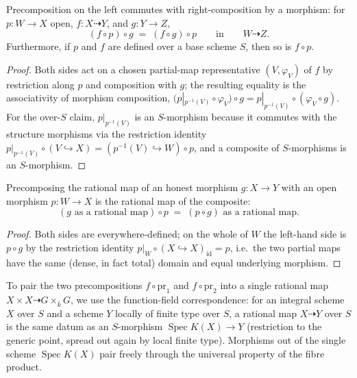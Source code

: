\begin{lemma}\leanok
  \label{lem:rationalMap_precomp_compHom}
  Precomposition on the left commutes with right-composition by a morphism: for
  \(p \colon W \to X\) open, \(f \colon X \dashrightarrow Y\), and \(g \colon Y \to Z\),
  \[
    (f \circ p) \circ g \;=\; (f \circ g) \circ p
    \qquad\text{in}\qquad W \dashrightarrow Z .
  \]
  Furthermore, if \(p\) and \(f\) are defined over a base scheme \(S\), then so is
  \(f \circ p\).
\end{lemma}
\begin{proof}\leanok
  Both sides act on a chosen partial-map representative \((V, \varphi_V)\) of \(f\) by
  restriction along \(p\) and composition with \(g\); the resulting equality is the
  associativity of morphism composition,
  \((p|_{p^{-1}(V)} \circ \varphi_V) \circ g = p|_{p^{-1}(V)} \circ (\varphi_V \circ g)\).
  For the over-\(S\) claim, \(p|_{p^{-1}(V)}\) is an \(S\)-morphism because it commutes with
  the structure morphisms via the restriction identity
  \(p|_{p^{-1}(V)} \circ (V \hookrightarrow X) = (p^{-1}(V) \hookrightarrow W) \circ p\),
  and a composite of \(S\)-morphisms is an \(S\)-morphism.
\end{proof}

\begin{lemma}\leanok
  \label{lem:rationalMap_precomp_hom}
  Precomposing the rational map of an honest morphism \(g \colon X \to Y\) with an open
  morphism \(p \colon W \to X\) is the rational map of the composite:
  \[
    (g \text{ as a rational map}) \circ p \;=\; (p \circ g) \text{ as a rational map} .
  \]
\end{lemma}
\begin{proof}\leanok
  Both sides are everywhere-defined; on the whole of \(W\) the left-hand side is
  \(p \circ g\) by the restriction identity \(p|_{W} \circ (X \hookrightarrow X)_{\mathrm{id}}
  = p\), i.e.\ the two partial maps have the same (dense, in fact total) domain and equal
  underlying morphism.
\end{proof}

To pair the two precompositions \(f \circ \mathrm{pr}_1\) and \(f \circ \mathrm{pr}_2\) into
a single rational map \(X \times X \dashrightarrow G \times_{\bar k} G\), we use the
function-field correspondence: for an integral scheme \(X\) over \(S\) and a scheme \(Y\)
locally of finite type over \(S\), a rational map \(X \dashrightarrow Y\) over \(S\) is the
same datum as an \(S\)-morphism \(\operatorname{Spec} K(X) \to Y\) (restriction to the generic
point, spread out again by local finite type). Morphisms out of the single scheme
\(\operatorname{Spec} K(X)\) pair freely through the universal property of the fibre product.

